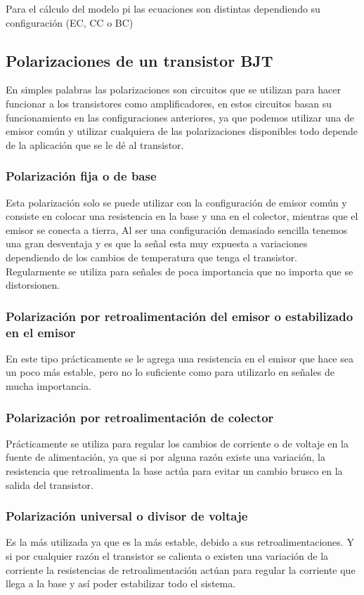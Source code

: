 Para el cálculo del modelo pi las ecuaciones son distintas
dependiendo su configuración (EC, CC o BC)

\subsection{Polarizaciones de un transistor BJT}

En simples palabras las polarizaciones son circuitos que se utilizan para hacer funcionar a los transistores como amplificadores, en estos circuitos basan su funcionamiento en las configuraciones anteriores, ya que podemos utilizar una de emisor común y utilizar cualquiera de las polarizaciones disponibles todo depende de la aplicación que se le dé al transistor.

\subsubsection{Polarización fija o de base}
Esta polarización solo se puede utilizar con la configuración de emisor común y consiste en colocar una resistencia en la base y una en el colector, mientras que el emisor se conecta a tierra, Al ser una configuración demasiado sencilla tenemos una gran desventaja y es que la señal esta muy expuesta a variaciones dependiendo de los cambios de temperatura que tenga el transistor. Regularmente se utiliza para señales de poca importancia que no importa que se distorsionen.

\subsubsection{Polarización por retroalimentación del emisor o estabilizado en el emisor}
En este tipo prácticamente se le agrega una resistencia en el emisor que hace sea un poco más estable, pero no lo suficiente como para utilizarlo en señales de mucha importancia.

\subsubsection{Polarización por retroalimentación de colector}
Prácticamente se utiliza para regular los cambios de corriente o de voltaje en la fuente de alimentación, ya que si por alguna razón existe una variación, la resistencia que retroalimenta la base actúa para evitar un cambio brusco en la salida del transistor.

\subsubsection{Polarización universal o divisor de voltaje}
Es la más utilizada ya que es la más estable, debido a sus retroalimentaciones. Y si por cualquier razón el transistor se calienta o existen una variación de la corriente la resistencias de retroalimentación actúan para regular la corriente que llega a la base y así poder estabilizar todo el sistema.

